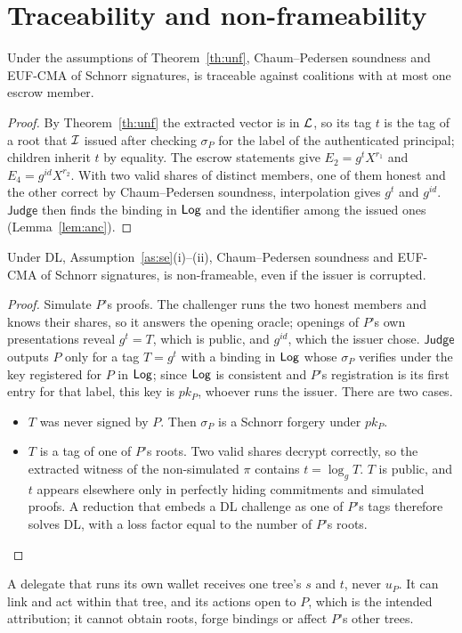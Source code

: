 \section{Traceability and non-frameability}\label{s:trace}
\begin{theorem}[TRACE]\label{th:trace}
Under the assumptions of Theorem~\ref{th:unf}, Chaum--Pedersen soundness and EUF-CMA of Schnorr signatures, \sys{} is traceable against coalitions with at most one escrow member.
\end{theorem}
\begin{proof}
By Theorem~\ref{th:unf} the extracted vector is in $\mathcal{L}$, so its tag $t$ is the tag of a root that $\mathcal{I}$ issued after checking $\sigma_P$ for the label of the authenticated principal; children inherit $t$ by equality. The escrow statements give $E_2=g^{t}X^{r_1}$ and $E_4=g^{\mathit{id}}X^{r_2}$. With two valid shares of distinct members, one of them honest and the other correct by Chaum--Pedersen soundness, interpolation gives $g^{t}$ and $g^{\mathit{id}}$. $\mathsf{Judge}$ then finds the binding in $\mathsf{Log}$ and the identifier among the issued ones (Lemma~\ref{lem:anc}).
\end{proof}

\begin{theorem}[NF]\label{th:nf}
Under DL, Assumption~\ref{as:se}(i)--(ii), Chaum--Pedersen soundness and EUF-CMA of Schnorr signatures, \sys{} is non-frameable, even if the issuer is corrupted.
\end{theorem}
\begin{proof}
Simulate $P$'s proofs. The challenger runs the two honest members and knows their shares, so it answers the opening oracle; openings of $P$'s own presentations reveal $g^{t}=T$, which is public, and $g^{\mathit{id}}$, which the issuer chose. $\mathsf{Judge}$ outputs $P$ only for a tag $T=g^{t}$ with a binding in $\mathsf{Log}$ whose $\sigma_P$ verifies under the key registered for $P$ in $\mathsf{Log}$; since $\mathsf{Log}$ is consistent and $P$'s registration is its first entry for that label, this key is $pk_P$, whoever runs the issuer. There are two cases.
\begin{itemize}[leftmargin=*]
\item $T$ was never signed by $P$. Then $\sigma_P$ is a Schnorr forgery under $pk_P$.
\item $T$ is a tag of one of $P$'s roots. Two valid shares decrypt correctly, so the extracted witness of the non-simulated $\pi$ contains $t=\log_g T$. $T$ is public, and $t$ appears elsewhere only in perfectly hiding commitments and simulated proofs. A reduction that embeds a DL challenge as one of $P$'s tags therefore solves DL, with a loss factor equal to the number of $P$'s roots.
\end{itemize}
\end{proof}
A delegate that runs its own wallet receives one tree's $s$ and $t$, never $u_P$. It can link and act within that tree, and its actions open to $P$, which is the intended attribution; it cannot obtain roots, forge bindings or affect $P$'s other trees.

